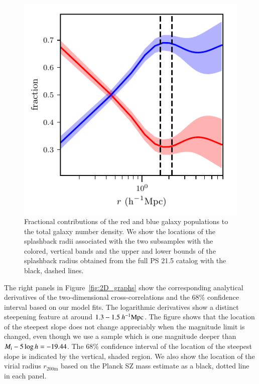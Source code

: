 \documentclass[iop, apjl, twocolappendix, numberedappendix]{emulateapj}
\def\mpch{h^{-1}{\rm Mpc}}
\begin{document}
\begin{figure}
    \includegraphics[width= \columnwidth]{color_fraction.pdf}
\caption{Fractional contributions of the red and blue galaxy
populations to the total galaxy number density. We show the
locations of the splashback radii associated with the two subsamples
with the colored, vertical bands and the upper and lower bounds of
the splashback radius obtained from the full PS 21.5 catalog with
the black, dashed lines.}
   \label{fig:color_fraction} 
\end{figure}
The right panels in Figure~\ref{fig:2D_graphs} show the
corresponding analytical derivatives of the two-dimensional
cross-correlations and the 68\% confidence interval based on our
model fits. The logarithmic derivatives show a distinct steepening
feature at around $1.3-1.5~\mpch$. The figure shows that the
location of the steepest slope does not change appreciably when the
magnitude limit is changed, even though we use a sample which is one
magnitude deeper than $M_{\rm i}-5\log h=-19.44$. The 68\%
confidence interval of the location of the steepest slope is
indicated by the vertical, shaded region. We also show the location
of the virial radius $r_{\mathrm{200m}}$ based on the Planck SZ mass estimate 
as a black, dotted line in each panel.
\end{document}
